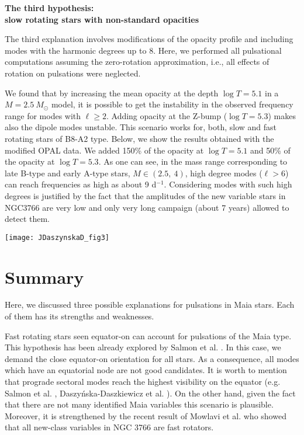 \documentclass[epj,twocolumn]{webofc}
\begin{document}
{\bf The third hypothesis: \\
slow rotating stars with non-standard opacities}

The third explanation involves modifications of the opacity profile and including modes with the harmonic degrees up to 8.
Here, we performed all pulsational computations assuming the zero-rotation approximation, i.e., all effects of rotation on pulsations were neglected.

We found that by increasing the mean opacity at the depth $\log T=5.1$ in a $M=2.5~M_\odot$ model, it is possible to get the instability
in the observed frequency range for modes with $\ell\ge 2$. Adding opacity at the Z-bump ($\log T= 5.3$) makes also the dipole modes unstable.
This scenario works for, both, slow and fast rotating stars of B8-A2 type. Below, we show the results obtained with the modified OPAL data.
We added 150\% of the opacity at $\log T=5.1$ and 50\% of the opacity at $\log T=5.3$.
As one can see, in the mass range corresponding to late B-type and early A-type stars, $M\in(2.5,~4)$, high degree modes ($\ell>6$)
can reach frequencies as high as about 9 d$^{-1}$. Considering modes with such high degrees is justified by the fact that the amplitudes
of the new variable stars in NGC3766 are very low and only very long campaign (about 7 years) allowed to detect them.
%
\begin{figure*}
\centering
\texttt{[image: JDaszynskaD\_fig3]}
\caption{The frequency range of unstable modes as a function of mass for ZAMS models computed with the modified OPAL opacity profile.
Modes with the harmonic degrees up to $\ell=8$ were considered. The opacities were increases  by 150\% at $\log T=5.1$ and by 50\% at $\log T=5.3$.
The values of the instability parameter are coded by colours.}
\label{fig-3}       %
\end{figure*}


\section{Summary}
\label{sec-con}
Here, we discussed three possible explanations for pulsations in Maia stars. Each of them has its strengths and weaknesses.

Fast rotating stars seen equator-on can account for pulsations of the Maia type. This hypothesis has been already explored by Salmon et al. \cite{2014A&A...569A..18S}.
In this case, we demand the close equator-on orientation for all stars. As a consequence, all modes which have an equatorial node are not good candidates.
It is worth to mention that prograde sectoral modes reach the highest visibility on the equator  (e.g. Salmon et al. \cite{2014A&A...569A..18S}, Daszy\'nska-Daszkiewicz et al. \cite{2007AcA....57...11D}).
On the other hand, given the fact that there are not many identified Maia variables this scenario is plausible.
Moreover, it is strengthened by the recent result of Mowlavi et al. \cite{2016arXiv161001077M} who showed that all new-class variables in NGC 3766 are fast rotators.
\end{document}
